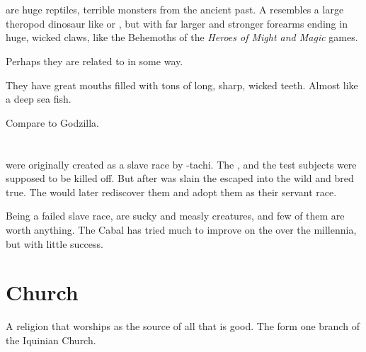 \section{\Gorgoroses}
\Gorgoroses{} are huge reptiles, terrible monsters from the ancient past. A \gorgoros{} resembles a large theropod dinosaur like  or , but with far larger and stronger forearms ending in huge, wicked claws, like the Behemoths of the \emph{Heroes of Might and Magic} games. 

Perhaps they are related to \dragons{} in some way. 

They have great mouths filled with tons of long, sharp, wicked teeth. Almost like a deep sea fish. 

Compare to Godzilla. 















\section{\Humans}
\Humans{} were originally created as a slave race by \Semiza-tachi. 
The , and the test subjects were supposed to be killed off. 
But after \Thanatzil{} was slain the \humans{} escaped into the wild and bred true. 
The \resphain{} would later rediscover them and adopt them as their servant race. 

Being a failed slave race, \humans{} are sucky and measly creatures, and few of them are worth anything. 
The Cabal has tried much to improve on the \humans{} over the millennia, but with little success. 















\section{\Iquinian{} Church}
\label{\Iquinian{} Church}
\label{Iquinian Church}
A religion that worships \iquin{} as the source of all that is good. The  form one branch of the Iquinian Church. 









